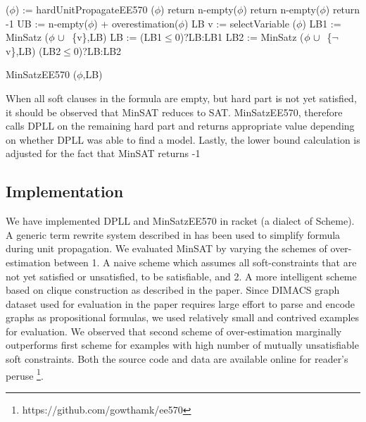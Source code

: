 \begin{algorithm}
 \SetAlgoLined 
 ($\phi$) := hardUnitPropagateEE570 ($\phi$)\;
  {return n-empty($\phi$)}
  {
      {return n-empty($\phi$)}
      {return -1}
 }
 UB := n-empty($\phi$) + overestimation($\phi$)\;
  {\Return LB}
 v := selectVariable ($\phi$)\;
 LB1 := MinSatz ($\phi ~\cup~ $ \{v\},LB)\;
 LB  := (LB1$\le$0)?LB:LB1\;
 LB2 := MinSatz ($\phi ~\cup~ $ \{$\neg$v\},LB)\;
  {\Return (LB2$\le$0)?LB:LB2}
 \caption{MinSatzEE570 ($\phi$,LB)}
\end{algorithm}

When all soft clauses in the formula are empty, but hard part is not yet
satisfied, it should be observed that MinSAT reduces to SAT. MinSatzEE570,
therefore calls DPLL on the remaining hard part and returns appropriate value
depending on whether DPLL was able to find a model. Lastly, the lower bound
calculation is adjusted for the fact that MinSAT returns -1

\subsection{Implementation}
We have implemented DPLL and MinSatzEE570 in racket (a dialect of Scheme). A
generic term rewrite system described in \cite{rewrite} has been used to
simplify formula during unit propagation. We evaluated MinSAT by varying the
schemes of over-estimation between 1. A naive scheme which assumes all
soft-constraints that are not yet satisfied or unsatisfied, to be satisfiable,
and 2. A more intelligent scheme based on clique construction as described in
the paper. Since DIMACS graph dataset used for evaluation in the paper requires
large effort to parse and encode graphs as propositional formulas, we used
relatively small and contrived examples for evaluation. We observed that second
scheme of over-estimation marginally outperforms first scheme for examples with
high number of mutually unsatisfiable soft constraints. Both the source code and
data are available online for reader's peruse
\footnote{https://github.com/gowthamk/ee570}.

